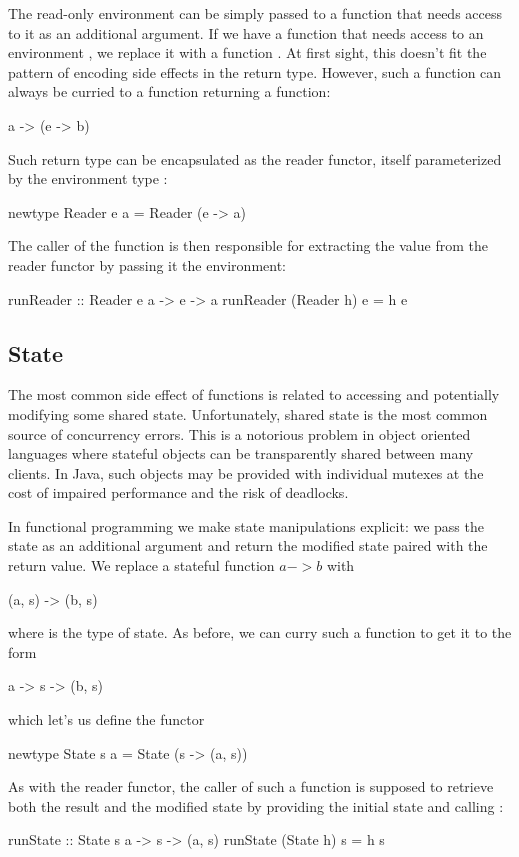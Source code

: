 \documentclass[DaoFP]{subfiles}
\begin{document}
The read-only environment can be simply passed to a function that needs access to it as an additional argument. If we have a function  that needs access to an environment , we replace it with a function . At first sight, this doesn't fit the pattern of encoding side effects in the return type. However, such a function can always be curried to a function returning a function:
\begin{haskell}
a -> (e -> b)
\end{haskell}
Such return type can be encapsulated as the reader functor, itself parameterized by the environment type :
\begin{haskell}
newtype Reader e a = Reader (e -> a)
\end{haskell}
The caller of the function is then responsible for extracting the value from the reader functor by passing it the environment:
\begin{haskell}
runReader :: Reader e a -> e -> a
runReader (Reader h) e = h e
\end{haskell}

\subsection{State}

The most common side effect of functions is related to accessing and potentially modifying some shared state. Unfortunately, shared state is the most common source of concurrency errors. This is a notorious problem in object oriented languages where stateful objects can be transparently shared between many clients. In Java, such objects may be provided with individual mutexes at the cost of impaired performance and the risk of deadlocks.

In functional programming we make state manipulations explicit: we pass the state as an additional argument and return the modified state paired with the return value. We replace a stateful function $a->b$ with
\begin{haskell}
(a, s) -> (b, s)
\end{haskell}
where  is the type of state. As before, we can curry such a function to get it to the form
\begin{haskell}
a -> s -> (b, s)
\end{haskell}
which let's us define the functor
\begin{haskell}
newtype State s a = State (s -> (a, s))
\end{haskell}
As with the reader functor, the caller of such a function is supposed to retrieve both the result and the modified state by providing the initial state and calling :
\begin{haskell}
runState :: State s a -> s -> (a, s)
runState (State h) s = h s
\end{haskell}
\end{document}
